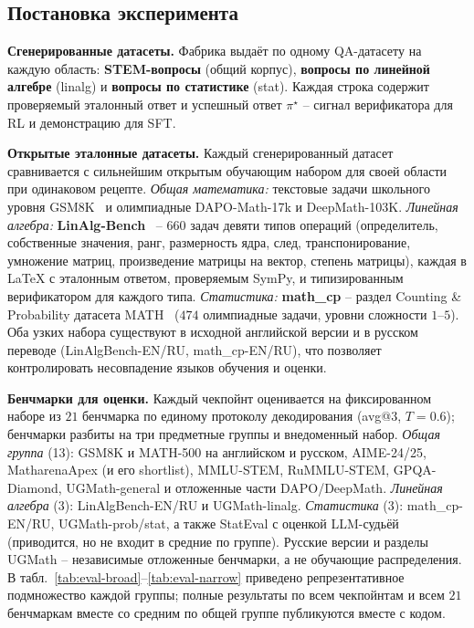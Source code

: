 \documentclass{article}
\begin{document}
\subsection{Постановка эксперимента}\label{sec:exp-setup}

\textbf{Сгенерированные датасеты.}
Фабрика выдаёт по одному QA-датасету на каждую область: \textbf{STEM-вопросы} (общий корпус), \textbf{вопросы по линейной алгебре} (linalg) и \textbf{вопросы по статистике} (stat). Каждая строка содержит проверяемый эталонный ответ и успешный ответ $\pi^\star$ -- сигнал верификатора для RL и демонстрацию для SFT.

\textbf{Открытые эталонные датасеты.}
Каждый сгенерированный датасет сравнивается с сильнейшим открытым обучающим набором для своей области при одинаковом рецепте. \emph{Общая математика:} текстовые задачи школьного уровня GSM8K~\cite{cobbe2021gsm8k} и олимпиадные DAPO-Math-17k и DeepMath-103K. \emph{Линейная алгебра:} \textbf{LinAlg-Bench}~\cite{agarwal2026linalgbench} -- $660$ задач девяти типов операций (определитель, собственные значения, ранг, размерность ядра, след, транспонирование, умножение матриц, произведение матрицы на вектор, степень матрицы), каждая в LaTeX с эталонным ответом, проверяемым SymPy, и типизированным верификатором для каждого типа. \emph{Статистика:} \textbf{math\_cp} -- раздел Counting \& Probability датасета MATH~\cite{hendrycks2021math} ($474$ олимпиадные задачи, уровни сложности $1$--$5$). Оба узких набора существуют в исходной английской версии и в русском переводе (LinAlgBench-EN/RU, math\_cp-EN/RU), что позволяет контролировать несовпадение языков обучения и оценки.

\textbf{Бенчмарки для оценки.}
Каждый чекпойнт оценивается на фиксированном наборе из $21$ бенчмарка по единому протоколу декодирования (avg@$3$, $T=0.6$); бенчмарки разбиты на три предметные группы и внедоменный набор. \emph{Общая группа} (13): GSM8K и MATH-500 на английском и русском, AIME-24/25, MatharenaApex (и его shortlist), MMLU-STEM, RuMMLU-STEM, GPQA-Diamond, UGMath-general и отложенные части DAPO/DeepMath. \emph{Линейная алгебра} (3): LinAlgBench-EN/RU и UGMath-linalg. \emph{Статистика} (3): math\_cp-EN/RU, UGMath-prob/stat, а также StatEval с оценкой LLM-судьёй (приводится, но не входит в средние по группе). Русские версии и разделы UGMath -- независимые отложенные бенчмарки, а не обучающие распределения. В табл.~\ref{tab:eval-broad}--\ref{tab:eval-narrow} приведено репрезентативное подмножество каждой группы; полные результаты по всем чекпойнтам и всем $21$ бенчмаркам вместе со средним по общей группе публикуются вместе с кодом.
\end{document}
